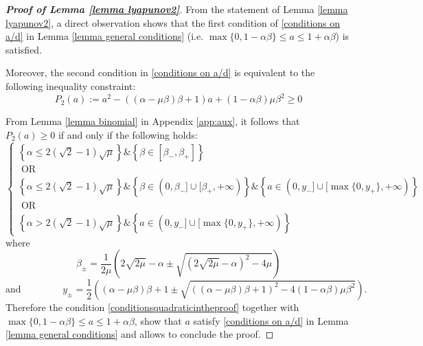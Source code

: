 \documentclass[reqno]{amsart}
\theoremstyle{plain}
\theoremstyle{definition}
\theoremstyle{remark}
\begin{document}
\begin{proof}[\textbf{Proof of Lemma \ref{lemma lyapunov2}}]
	From the statement of Lemma \ref{lemma lyapunov2}, a direct observation shows that the  first condition of \eqref{conditions on a/d} in Lemma \ref{lemma general conditions} (i.e. $\max\{0,1-\alpha\beta\}\leq a\leq 1+\alpha\beta$) is satisfied.
	
	Moreover, the second condition in \eqref{conditions on a/d} is equivalent to the following inequality constraint:
	\begin{equation}\label{P2aconditioninproof}
		P_{2}(a):=a^{2} - \left((\alpha-\mu\beta)\beta+1\right)a +(1-\alpha\beta)\mu\beta^{2}\geq 0
	\end{equation}
	
	From Lemma \ref{lemma binomial} in Appendix \ref{app:aux}, it follows that  $P_{2}(a) \geq 0$  if and only if the following holds:
	\begin{equation}\label{conditionsquadraticintheproof}
		\begin{cases}
			\left\{\alpha \leq 2(\sqrt{2}-1)\sqrt{\mu}\right\}\&\left\{\beta\in [\beta_{-},\beta_{+}]\right\} \\
			\text{ OR } \\
			\left\{\alpha \leq 2(\sqrt{2}-1)\sqrt{\mu}\right\}\&\left\{\beta\in (0,\beta_{-}]\cup[\beta_{+},+\infty)\right\}\&\left\{a\in (0,y_{-}]\cup[\max\{0,y_{+}\},+\infty)\right\} \\
			\text{ OR } \\
			\left\{\alpha > 2(\sqrt{2}-1)\sqrt{\mu}\right\}\&\left\{a\in (0,y_{-}]\cup[\max\{0,y_{+}\},+\infty)\right\}
		\end{cases}
	\end{equation}
	where \begin{equation}
		\beta_{\pm}=\frac{1}{2\mu}\left(2\sqrt{2\mu}-\alpha \pm \sqrt{\left(2\sqrt{2\mu}-\alpha\right)^{2} - 4\mu}\right)
	\end{equation} 
	\begin{equation}
	\text{and } \qquad \qquad	y_{\pm}=\frac{1}{2}\left((\alpha-\mu\beta)\beta+1 \pm \sqrt{\left((\alpha-\mu\beta)\beta+1\right)^{2}-4(1-\alpha\beta)\mu\beta^{2}}\right).
	\end{equation}
	Therefore the condition \eqref{conditionsquadraticintheproof} together with $\max\{0,1-\alpha\beta\}\leq a\leq 1+\alpha\beta$, show that $a$ satisfy \eqref{conditions on a/d} in Lemma \ref{lemma general conditions} and allows to conclude the proof.
\end{proof}
\end{document}
